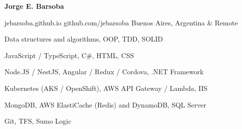 \documentclass[11pt]{article} %
\begin{document}
\centerline{{\Huge \bf Jorge E. Barsoba}}

\bigskip

        {jebarsoba.github.io}
        {github.com/jebarsoba}
        {Buenos Aires, Argentina \& Remote}


      {Data structures and algorithms, OOP, TDD, SOLID}

      {JavaScript / TypeScript, C\#, HTML, CSS}

      {Node.JS / NestJS, Angular / Redux / Cordova, .NET Framework}

      {Kubernetes (AKS / OpenShift), AWS API Gateway / Lambda, IIS}

      {MongoDB, AWS ElastiCache (Redis) and DynamoDB, SQL Server}

      {Git, TFS, Sumo Logic}

\end{document}
